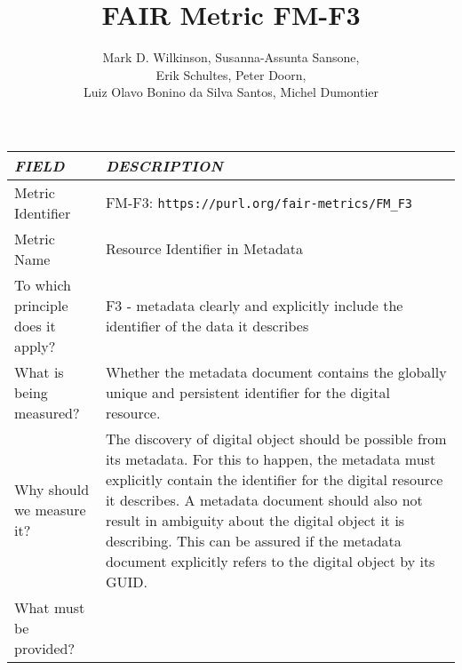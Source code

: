 \documentclass[english]{article}
\begin{document}
\title{FAIR Metric FM-F3}

\author{Mark D. Wilkinson, Susanna-Assunta Sansone, \\Erik Schultes, Peter Doorn,\\ 
Luiz Olavo Bonino da Silva Santos, Michel Dumontier}

\maketitle

\newpage





\begin{longtable}{|p{5cm}|p{9cm}|}


\hline
\emph{FIELD} & \emph{DESCRIPTION} \\
\hline
Metric Identifier &   FM-F3: \verb"https://purl.org/fair-metrics/FM_F3"
 \\


\hline
Metric Name &   

Resource Identifier in Metadata


 \\



\hline
To which principle does it apply? &   
F3 - metadata clearly and explicitly include the identifier of the data it describes
\\



\hline
What is being measured? & 


Whether the metadata document contains the globally unique and persistent identifier for the digital resource.

\\



\hline
Why should we measure it? & 



The discovery of digital object should be possible from its metadata. For this to happen, the metadata must explicitly contain the identifier for the digital resource it describes. 
A metadata document should also not result in ambiguity about the digital object it is describing. This can be assured if the metadata document explicitly refers to the digital object by its GUID.

  
\\



\hline
What must be provided? &  



\end{longtable}
\end{document}
